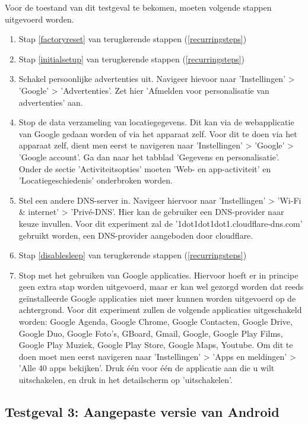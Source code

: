 Voor de toestand van dit testgeval te bekomen, moeten volgende stappen uitgevoerd worden.

\begin{enumerate}
    \item Stap \ref{factoryreset} van terugkerende stappen (\ref{recurringsteps})
    \item Stap \ref{initialsetup} van terugkerende stappen (\ref{recurringsteps})
    \item Schakel persoonlijke advertenties uit. Navigeer hievoor naar 'Instellingen' > 'Google' > 'Advertenties'. Zet hier 'Afmelden voor personalisatie van advertenties' aan.
    \item Stop de data verzameling van locatiegegevens. Dit kan via de webapplicatie van Google gedaan worden of via het apparaat zelf. Voor dit te doen via het apparaat zelf, dient men eerst te navigeren naar 'Instellingen' > 'Google' > 'Google account'. Ga dan naar het tabblad 'Gegevens en personalisatie'. Onder de sectie 'Activiteitsopties' moeten 'Web- en app-activiteit' en 'Locatiegeschiedenis' onderbroken worden.
    \item Stel een andere DNS-server in. Navigeer hiervoor naar 'Instellingen' > 'Wi-Fi \& internet' > 'Privé-DNS'. Hier kan de gebruiker een DNS-provider naar keuze invullen. Voor dit experiment zal de '1dot1dot1dot1.cloudflare-dns.com' gebruikt worden, een DNS-provider aangeboden door cloudflare.
    \item Stap \ref{disablesleep} van terugkerende stappen (\ref{recurringsteps})
    \item Stop met het gebruiken van Google applicaties. Hiervoor hoeft er in principe geen extra stap worden uitgevoerd, maar er kan wel gezorgd worden dat reeds geïnstalleerde Google applicaties niet meer kunnen worden uitgevoerd op de achtergrond. Voor dit experiment zullen de volgende applicaties uitgeschakeld worden: Google Agenda, Google Chrome, Google Contacten, Google Drive, Google Duo, Google Foto's, GBoard, Gmail, Google, Google Play Films, Google Play Muziek, Google Play Store, Google Maps, Youtube. Om dit te doen moet men eerst navigeren naar 'Instellingen' > 'Apps en meldingen' > 'Alle 40 apps bekijken'. Druk één voor één de applicatie aan die u wilt uitschakelen, en druk in het detailscherm op 'uitschakelen'.
\end{enumerate}
    
\subsection{Testgeval 3: Aangepaste versie van Android}

